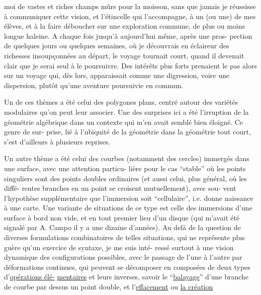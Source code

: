
moi de vastes et riches champs mûrs pour la moisson, sans que
jamais je réussisse à communiquer cette vision, et l'étincelle
qui l'accompagne, à un (ou une) de mes élèves, et à la faire
déboucher sur une exploration commune, de plus ou moins longue
haleine. A chaque fois jusqu'à aujourd'hui même, après une pros-%
pection de quelques jours ou quelques semaines, où je découvrais
en éclaireur des richesses insoupçonnées au départ, le voyage
tournait court, quand il devenait clair que je serai seul à le
poursuivre. Des intérêts plus forts prenaient le pas alors sur
un voyage qui, dès lors, apparaissait comme une digression, voire
une dispersion, plutôt qu'une aventure poursuivie en commun.

Un de ces thèmes a été celui des polygones plans, centré
autour des variétés modulaires qu'on peut leur associer. Une des
surprises ici a été l'irruption de la géométrie algébrique dans
un contexte qui m'en avait semblé bien éloigné. Ce genre de sur-%
prise, lié à l'ubiquité de la géométrie dans la géométrie tout
court, s'est d'ailleurs  à plusieurs reprises.

Un autre thème a été celui des courbes (notamment des
cercles) immergés dans une surface, avec une attention particu-%
lière pour le cas ``stable'' où les points singuliers sont des points
doubles ordinaires (et aussi celui, plus général, où les diffé-%
rentes branches en un point se croisent mutuellement), avec sou-%
vent l'hypothèse supplémentaire que l'immersion soit ``cellulaire'',
i.e. donne naissance à une carte. Une variante de situations de
ce type est celle des immersions d'une surface à bord non vide,
et en tout premier lieu d'un disque (qui m'avait été signalé par
A. Campo il y a une dizaine d'années). Au delà de la question de
diverses formulations combinatoires de telles situations, qui ne
représente plus guère qu'un exercice de syntaxe, je me suis inté-%
ressé surtout à une vision dynamique des configurations possibles,
avec le passage de l'une à l'autre par déformations continues, qui
peuvent se décomposer en composées de deux types d'\uline{opérations élé-}%
\uline{mentaires} et leurs inverses, savoir le ``\uline{balayage}'' d'une branche
de courbe par dessus un point double, et l'\uline{effacement} ou \uline{la création}

